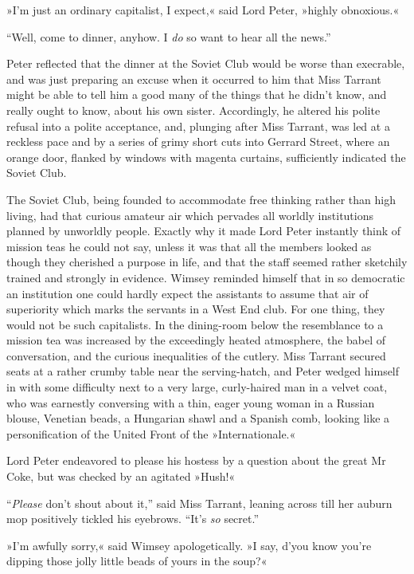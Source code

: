 »I'm just an ordinary capitalist, I expect,« said Lord Peter, »highly obnoxious.«

\enquote{Well, come to dinner, anyhow. I \textit{do} so want to hear all the news.}

Peter reflected that the dinner at the Soviet Club would be worse than execrable, and was just preparing an excuse when it occurred to him that Miss Tarrant might be able to tell him a good many of the things that he didn't know, and really ought to know, about his own sister.  Accordingly, he altered his polite refusal into a polite acceptance, and, plunging after Miss Tarrant, was led at a reckless pace and by a series of grimy short cuts into Gerrard Street, where an orange door, flanked by windows with magenta curtains, sufficiently indicated the Soviet Club.

The Soviet Club, being founded to accommodate free thinking rather than high living, had that curious amateur air which pervades all worldly institutions planned by unworldly people. Exactly why it made Lord Peter instantly think of mission teas he could not say, unless it was that all the members looked as though they cherished a purpose in life, and that the staff seemed rather sketchily trained and strongly in evidence. Wimsey reminded himself that in so democratic an institution one could hardly expect the assistants to assume that air of superiority which marks the servants in a West End club. For one thing, they would not be such capitalists. In the dining-room below the resemblance to a mission tea was increased by the exceedingly heated atmosphere, the babel of conversation, and the curious inequalities of the cutlery. Miss Tarrant secured seats at a rather crumby table near the serving-hatch, and Peter wedged himself in with some difficulty next to a very large, curly-haired man in a velvet coat, who was earnestly conversing with a thin, eager young woman in a Russian blouse, Venetian beads, a Hungarian shawl and a Spanish comb, looking like a personification of the United Front of the »Internationale.«

Lord Peter endeavored to please his hostess by a question about the great Mr Coke, but was checked by an agitated »Hush!«

\enquote{\textit{Please} don't shout about it,} said Miss Tarrant, leaning across till her auburn mop positively tickled his eyebrows. \enquote{It's \textit{so} secret.}

»I'm awfully sorry,« said Wimsey apologetically. »I say, d'you know you're dipping those jolly little beads of yours in the soup?«

